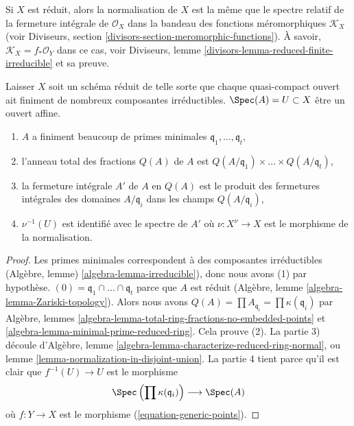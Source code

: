 \noindent
Si $X$ est réduit, alors la normalisation de $X$ est la même que le spectre relatif de la fermeture intégrale de $\mathcal{O}_X$ dans la bandeau des fonctions méromorphiques $\mathcal{K}_X$ (voir Diviseurs, section \ref{divisors-section-meromorphic-functions}). À savoir, $\mathcal{K}_X = f_*\mathcal{O}_Y$ dans ce cas, voir Diviseurs, lemme \ref{divisors-lemma-reduced-finite-irreducible} et sa preuve.

\begin{lemma}

\label{lemma-description-normalization}

Laisser $X$ soit un schéma réduit de telle sorte que chaque quasi-compact ouvert ait finiment de nombreux composantes irréductibles. $\Spec(A) = U \subset X$
être un ouvert affine.

\begin{enumerate}

\item  $A$ a finiment beaucoup de primes minimales
$\mathfrak q_1, \ldots, \mathfrak q_t$,
\item l'anneau total des fractions $Q(A)$ de $A$ est
$Q(A/\mathfrak q_1) \times \ldots \times Q(A/\mathfrak q_t)$,
\item la fermeture intégrale $A'$ de $A$ en $Q(A)$ est le produit des fermetures intégrales des domaines $A/\mathfrak q_i$
dans les champs $Q(A/\mathfrak q_i)$,
\item  $\nu^{-1}(U)$ est identifié avec le spectre de $A'$ où
$\nu : X^\nu \to X$ est le morphisme de la normalisation.

\end{enumerate}

\end{lemma}

\begin{proof}

Les primes minimales correspondent à des composantes irréductibles (Algèbre, lemme) \ref{algebra-lemma-irreducible}), donc nous avons (1) par hypothèse.
$(0) = \mathfrak q_1 \cap \ldots \cap \mathfrak q_t$ parce que $A$ est réduit (Algèbre, lemme \ref{algebra-lemma-Zariski-topology}). Alors nous avons
$Q(A) = \prod A_{\mathfrak q_i} = \prod \kappa(\mathfrak q_i)$
par Algèbre, lemmes \ref{algebra-lemma-total-ring-fractions-no-embedded-points}
et \ref{algebra-lemma-minimal-prime-reduced-ring}. Cela prouve (2). La partie 3) découle d'Algèbre, lemme \ref{algebra-lemma-characterize-reduced-ring-normal}, ou lemme \ref{lemma-normalization-in-disjoint-union}. La partie 4 tient parce qu'il est clair que $f^{-1}(U) \to U$ est le morphisme
$$
\Spec\left(\prod \kappa(\mathfrak q_i)\right)
\longrightarrow
\Spec(A)
$$
où $f : Y \to X$ est le morphisme (\ref{equation-generic-points}).

\end{proof}

